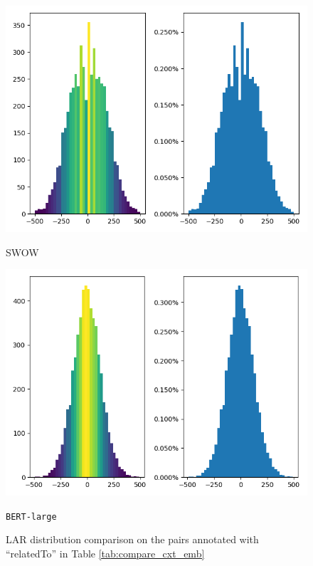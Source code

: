 \documentclass[letterpaper]{article} %
\begin{document}
\begin{figure}[!]
\centering
\begin{minipage}[b]{0.45\textwidth}
    \includegraphics[width=\textwidth]{rel_relatedto_gtSWOW_bert_large.png}
    \caption*{SWOW}
  \end{minipage}
  \hfill
  \begin{minipage}[b]{0.45\textwidth}
    \includegraphics[width=\textwidth]{rel_relatedtoSWOW_bert_large.png}
    \caption*{\texttt{BERT-large}}
  \end{minipage}
\caption{LAR distribution comparison on the pairs annotated with ``relatedTo'' in Table \ref{tab:compare_cxt_emb} }
\label{fig:compare_lar_relatedto}
\end{figure}
\end{document}
